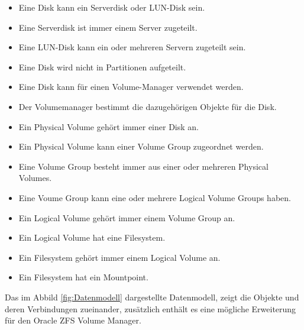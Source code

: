 \begin{itemize}
\item Eine Disk kann ein Serverdisk oder LUN-Disk sein.
\item Eine Serverdisk ist immer einem Server zugeteilt. 
\item Eine LUN-Disk kann ein oder mehreren Servern zugeteilt sein.
\item Eine Disk wird nicht in Partitionen aufgeteilt.
\item Eine Disk kann für einen Volume-Manager verwendet werden.
\item Der Volumemanager bestimmt die dazugehörigen Objekte für die Disk.\newline
\end{itemize}


\begin{itemize}
\item Ein Physical Volume gehört immer einer Disk an.
\item Ein Physical Volume kann einer Volume Group zugeordnet werden.\newline
\end{itemize}


\begin{itemize}
\item Eine Volume Group besteht immer aus einer oder mehreren Physical Volumes.
\item Eine Voume Group kann eine oder mehrere Logical Volume Groups haben.\newline
\end{itemize}


\begin{itemize}
\item Ein Logical Volume gehört immer einem Volume Group an.
\item Ein Logical Volume hat eine Filesystem.\newline
\end{itemize}


\begin{itemize}
\item Ein Filesystem gehört immer einem Logical Volume an.
\item Ein Filesystem hat ein Mountpoint.\newline
\end{itemize}

Das im Abbild \ref{fig:Datenmodell} dargestellte Datenmodell, zeigt die Objekte und deren Verbindungen zueinander, zusätzlich enthält es eine mögliche Erweiterung für den Oracle ZFS Volume Manager.

